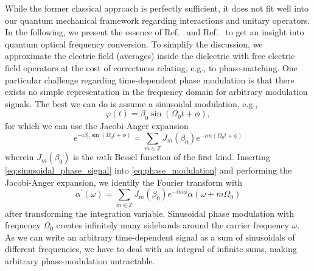 While the former classical approach is perfectly sufficient, it does not fit well into our quantum mechanical framework regarding interactions and unitary operators.
In the following, we present the essence of Ref.~\cite{QuesadaMejia2015} and Ref.~\cite{Horoshko2018} to get an insight into quantum optical frequency conversion.
To simplify the discussion, we approximate the electric field (averages) inside the dielectric with free electric field operators at the cost of correctness relating, e.g., to phase-matching.
One particular challenge regarding time-dependent phase modulation is that there exists no simple representation in the frequency domain for arbitrary modulation signals. 
The best we can do is assume a sinusoidal modulation, e.g.,
\begin{equation}
	\varphi(t)
	=
	\beta_0
	\sin(\Omega_0t+\phi)
	\label{eq:sinusoidal_phase_signal}
	,
\end{equation}
for which we can use the Jacobi-Anger expansion~\cite[eq.~23]{Horoshko2018}
\begin{equation}
	e^{-i\beta_0\sin(\Omega_0t+\phi)}
	=
	\sum_{m\in\mathbb{Z}}
	J_m(\beta_0)
	e^{-im(\Omega_0t+\phi)}
	\label{eq:jacobi_anger_expansion}
\end{equation}
wherein $J_m(\beta_0)$ is the $m$th Bessel function of the first kind.
Inserting \cref{eq:sinusoidal_phase_signal} into \cref{eq:phase_modulation} and performing the Jacobi-Anger expansion, we identify the Fourier transform with
\begin{equation}
	\alpha^\prime(\omega)
	=
	\sum_{m\in\mathbb{Z}}
	J_m(\beta_0)
	e^{-im\phi}
	\alpha(\omega+m\Omega_0)
	\label{eq:sinusoidal_phase_signal_fourier}
\end{equation}
after transforming the integration variable.
Sinusoidal phase modulation with frequency $\Omega_0$ creates infinitely many sidebands around the carrier frequency $\omega$.
As we can write an arbitrary time-dependent signal as a sum of sinusoidals of different frequencies, we have to deal with an integral of infinite sums, making arbitrary phase-modulation untractable.

